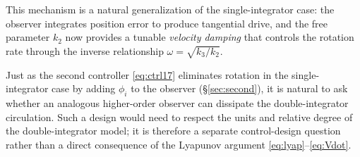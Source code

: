 This mechanism is a natural generalization of the single-integrator case: the observer integrates
position error to produce tangential drive, and the free parameter $k_2$ now provides a tunable
\emph{velocity damping} that controls the rotation rate through the inverse relationship
$\omega=\sqrt{k_3/k_2}$.

\begin{remark}
Just as the second controller \eqref{eq:ctrl17} eliminates rotation in the single-integrator case
by adding $\phi_i$ to the observer (\S\ref{sec:second}), it is natural to ask whether an analogous
higher-order observer can dissipate the double-integrator circulation. Such a design would need to
respect the units and relative degree of the double-integrator model; it is therefore a separate
control-design question rather than a direct consequence of the Lyapunov argument
\eqref{eq:lyap}--\eqref{eq:Vdot}.
\end{remark}

